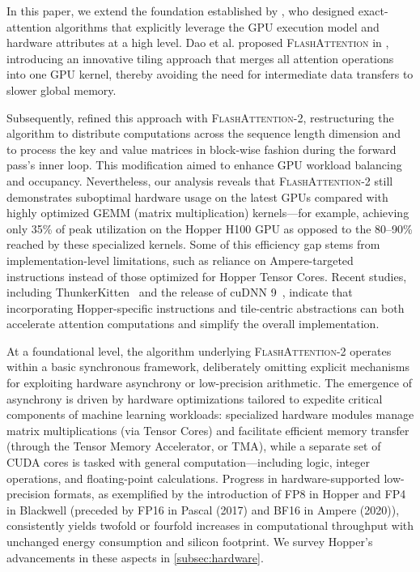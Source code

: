 In this paper, we extend the foundation established by \citet{dao2022flashattention}, who designed exact-attention algorithms that explicitly leverage the GPU execution model and hardware attributes at a high level. Dao et al. proposed \textsc{FlashAttention} in \citep{dao2022flashattention}, introducing an innovative tiling approach that merges all attention operations into one GPU kernel, thereby avoiding the need for intermediate data transfers to slower global memory.

Subsequently, \citet{dao2023flashattention2} refined this approach with \textsc{FlashAttention-2}, restructuring the algorithm to distribute computations across the sequence length dimension and to process the key and value matrices in block-wise fashion during the forward pass's inner loop. This modification aimed to enhance GPU workload balancing and occupancy. Nevertheless, our analysis reveals that \textsc{FlashAttention-2} still demonstrates suboptimal hardware usage on the latest GPUs compared with highly optimized GEMM (matrix multiplication) kernels—for example, achieving only 35\% of peak utilization on the Hopper H100 GPU as opposed to the 80–90\% reached by these specialized kernels. Some of this efficiency gap stems from implementation-level limitations, such as reliance on Ampere-targeted instructions instead of those optimized for Hopper Tensor Cores. Recent studies, including ThunkerKitten~\citep{spector2024thunder} and the release of cuDNN 9~\citep{cudnn9}, indicate that incorporating Hopper-specific instructions and tile-centric abstractions can both accelerate attention computations and simplify the overall implementation.

At a foundational level, the algorithm underlying \textsc{FlashAttention-2} operates within a basic synchronous framework, deliberately omitting explicit mechanisms for exploiting hardware asynchrony or low-precision arithmetic. The emergence of asynchrony is driven by hardware optimizations tailored to expedite critical components of machine learning workloads: specialized hardware modules manage matrix multiplications (via Tensor Cores) and facilitate efficient memory transfer (through the Tensor Memory Accelerator, or TMA), while a separate set of CUDA cores is tasked with general computation—including logic, integer operations, and floating-point calculations. Progress in hardware-supported low-precision formats, as exemplified by the introduction of FP8 in Hopper and FP4 in Blackwell (preceded by FP16 in Pascal (2017) and BF16 in Ampere (2020)), consistently yields twofold or fourfold increases in computational throughput with unchanged energy consumption and silicon footprint. We survey Hopper's advancements in these aspects in \cref{subsec:hardware}.

